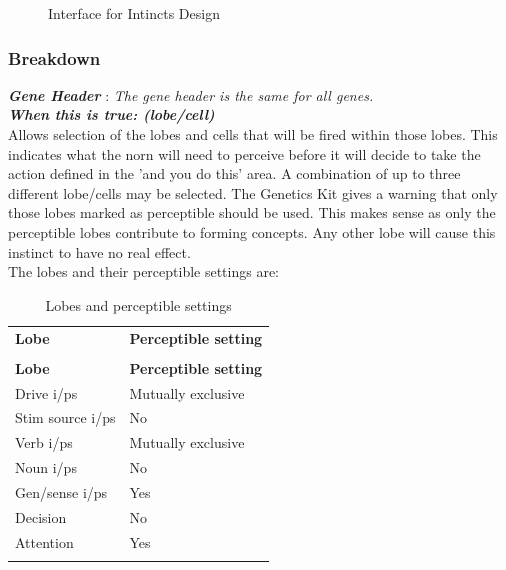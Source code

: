 \documentclass[11pt,twoside,a4paper]{article}
\begin{document}
\begin{figure}[H]
	\centerline {} %
	\caption{Interface for Intincts Design}
	\label{fig:genes_instinct}
\end{figure}

\subsubsection{Breakdown}

\textbf{\textit{Gene Header}} : \emph{The gene header is the same for all genes.}~\\

\textbf{\textit{When this is true: (lobe/cell)}}~\\

Allows selection of the lobes and cells that will be fired within those lobes. This indicates what the norn will need to perceive before it will decide to take the action defined in the 'and you do this' area. A combination of up to three different lobe/cells may be selected. The Genetics Kit gives a warning that only those lobes marked as perceptible should be used. This makes sense as only the perceptible lobes contribute to forming concepts. Any other lobe will cause this instinct to have no real effect.~\\

The lobes and their perceptible settings are:
\begin{longtable}{|p{}|p{}|}
	\hline \rowcolor[gray]{0.50} \multicolumn{2}{|c|}{Lobes and perceptible settings} \\
	\hline \rowcolor[gray]{0.75} \textbf{Lobe} & \textbf{Perceptible setting} \\ \hline
	\endfirsthead
	\hline \rowcolor[gray]{0.50} \multicolumn{2}{|c|}{Lobes and perceptible settings} \\
	\hline \rowcolor[gray]{0.75} \textbf{Lobe} & \textbf{Perceptible setting} \\ \hline
	\endhead
	\hline 
	\endfoot

		Drive i/ps 		&	Mutually exclusive \\ \hline
		Stim source i/ps 	&	No \\ \hline
		Verb i/ps 		&	Mutually exclusive \\ \hline
		Noun i/ps 		&	No \\ \hline
		Gen/sense i/ps 		&	Yes \\ \hline
		Decision 		&	No \\ \hline
		Attention 		&	Yes \\ \hline

	\hline
	\caption{Lobes and perceptible settings}
	\label{tab:Lobes_and_perceptible_settings}\\
\end{longtable}~\\~\\
\end{document}
